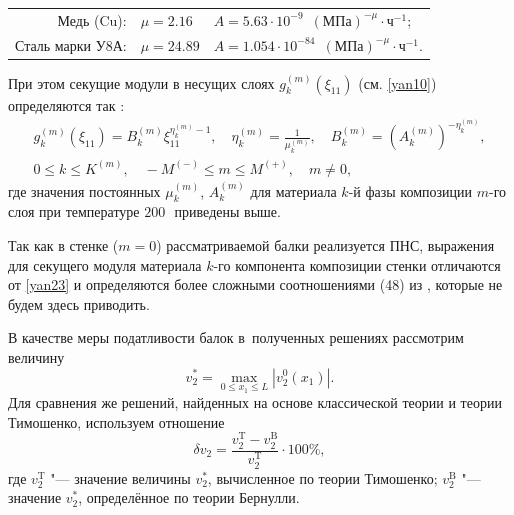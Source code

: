 \smallskip
 
\begin{tabular}{rll}
Медь (Cu): & $\mu=2.16$ & $A= 5.63\cdot10^{-9}$~$(\text{МПа})^{-\mu}\cdot\text{ч}^{-1}$; 
\\
Сталь марки У8А:& $\mu=24.89$ & $A= 1.054\cdot10^{-84}$~$(\text{МПа})^{-\mu}\cdot\text{ч}^{-1}$.
\end{tabular}

\smallskip

При этом секущие модули в несущих слоях $g_k^{(m)}(\xi_{11})$ (см. \eqref{yan10}) определяются так \cite{yan:bib4}:
\begin{equation}
\label{yan23}
\begin{array}{c}
\displaystyle g_k^{(m)}(\xi_{11})=B_k^{(m)}\xi_{11}^{\eta_k^{(m)}-1},\quad \eta_k^{(m)}=\frac{1}{\mu_k^{(m)}},\quad B_k^{(m)}=(A_k^{(m)})^{-\eta_k^{(m)}}, 
\\ 
0\le k\le K^{(m)},\quad - M^{(-)}\le m\le M^{(+)},\quad m\ne0, 
\end{array}
\end{equation}
где значения постоянных $\mu_k^{(m)}$, $A_k^{(m)}$ для материала $k$-й фазы композиции $m$-го слоя при температуре $%
200$\,\textcelsius\ приведены выше.

Так как в стенке ($m=0$) рассматриваемой балки реализуется ПНС, выражения для секущего модуля материала $k$-го компонента композиции стенки отличаются от \eqref{yan23} и определяются более сложными соотношениями (48) из \cite{yan:bib13}, которые не будем здесь приводить.

В качестве меры податливости балок в~полученных решениях рассмотрим величину
\begin{equation}
\label{yan24}
v_2^*=\max\limits_{0\le x_1\le L}|v_2^0(x_1)|.
\end{equation}
Для сравнения же решений, найденных на основе классической теории и теории Тимошенко, используем отношение
\begin{equation}
\label{yan25}
\delta v_2=\frac{v_2^\text{T}-v_2^\text{B}}{v_2^\text{T}}\cdot100\%,
\end{equation}
где $v_2^\text{T}$ "--- значение величины $v_2^*$, вычисленное по теории Тимошенко; $v_2^\text{B}$ "--- значение $v_2^*$, определённое по теории Бернулли. 


